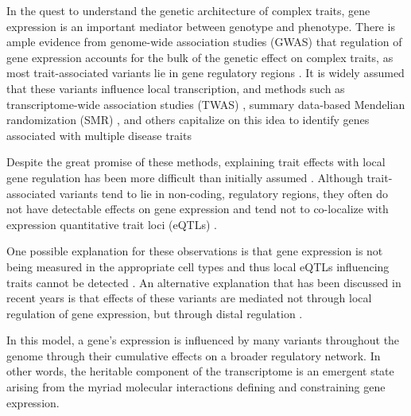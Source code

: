 \documentclass[
]{article}
\begin{document}
In the quest to understand the genetic architecture of complex traits,
gene expression is an important mediator between genotype and phenotype.
There is ample evidence from genome-wide association studies (GWAS) that
regulation of gene expression accounts for the bulk of the genetic
effect on complex traits, as most trait-associated variants lie in gene
regulatory regions \cite{pmid22955828, 
pmid25363779, pmid21617055, pmid19474294, pmid24702953, 
pmid24316577, pmid27126046}. It is widely assumed that these variants
influence local transcription, and methods such as transcriptome-wide
association studies (TWAS)
\cite{pmid33020666, pmid26258848, pmid27019110, pmid26854917}, summary
data-based Mendelian randomization (SMR) \cite{pmid27019110}, and others
capitalize on this idea to identify genes associated with multiple
disease traits \cite{pmid29567659, pmid35533209, pmid27309819, 
pmid30950127}

Despite the great promise of these methods, explaining trait effects
with local gene regulation has been more difficult than initially
assumed \cite{pmid32912663, pmid36515579}. Although trait-associated
variants tend to lie in non-coding, regulatory regions, they often do
not have detectable effects on gene expression \cite{pmid32912663} and
tend not to co-localize with expression quantitative trait loci (eQTLs)
\cite{pmid36515579, pmid37857933}.

One possible explanation for these observations is that gene expression
is not being measured in the appropriate cell types and thus local eQTLs
influencing traits cannot be detected \cite{pmid32912663}. An
alternative explanation that has been discussed in recent years is that
effects of these variants are mediated not through local regulation of
gene expression, but through distal regulation
\cite{pmid37857933, pmid32424349, 
pmid32831138, pmid30950127}.

In this model, a gene's expression is influenced by many variants
throughout the genome through their cumulative effects on a broader
regulatory network. In other words, the heritable component of the
transcriptome is an emergent state arising from the myriad molecular
interactions defining and constraining gene expression.
\end{document}
